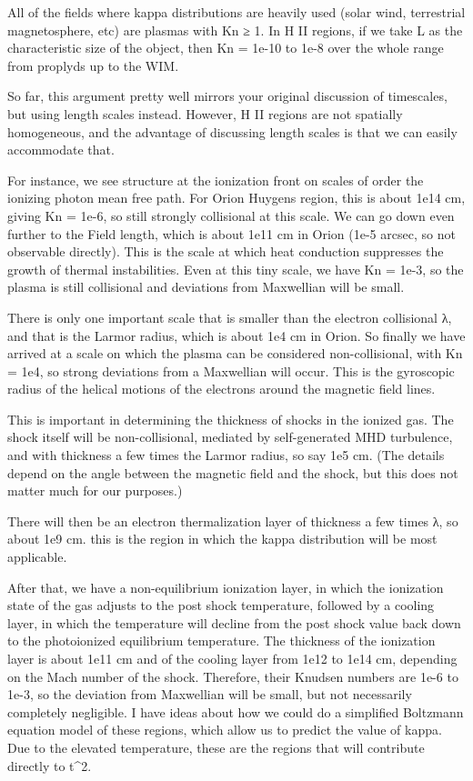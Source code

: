 \documentclass[11pt]{article}
\begin{document}
All of the fields where kappa distributions are heavily used (solar wind, terrestrial magnetosphere, etc) are plasmas with Kn ≥ 1.  In H II regions, if we take L as the characteristic size of the object, then Kn = 1e-10 to 1e-8 over the whole range from proplyds up to the WIM.

So far, this argument pretty well mirrors your original discussion of timescales, but using length scales instead.  However, H II regions are not spatially homogeneous, and the advantage of discussing length scales is that we can easily accommodate that.

For instance, we see structure at the ionization front on scales of order the ionizing photon mean free path.  For Orion Huygens region, this is about 1e14 cm, giving Kn = 1e-6, so still strongly collisional at this scale.  We can go down even further to the Field length, which is about 1e11 cm in Orion (1e-5 arcsec, so not observable directly).  This is the scale at which heat conduction suppresses the growth of thermal instabilities. Even at this tiny scale, we have Kn = 1e-3, so the plasma is still collisional and deviations from Maxwellian will be small.

There is only one important scale that is smaller than the electron collisional λ, and that is the Larmor radius, which is about 1e4 cm in Orion.  So finally we have arrived at a scale on which the plasma can be considered non-collisional, with Kn = 1e4, so strong deviations from a Maxwellian will occur.  This is the gyroscopic radius of the helical motions of the electrons around the magnetic field lines.

This is important in determining the thickness of shocks in the ionized gas.  The shock itself will be non-collisional, mediated by self-generated MHD turbulence, and with thickness a few times the Larmor radius, so say 1e5 cm.  (The details depend on the angle between the magnetic field and the shock, but this does not matter much for our purposes.)

There will then be an electron thermalization layer of thickness a few times λ, so about 1e9 cm.  this is the region in which the kappa distribution will be most applicable.

After that, we have a non-equilibrium ionization layer, in which the ionization state of the gas adjusts to the  post shock temperature, followed by a cooling layer, in which the temperature will  decline from the post shock value back down to the photoionized equilibrium temperature.    The thickness of the ionization layer is about 1e11 cm and of the cooling layer from 1e12 to 1e14 cm, depending on the Mach number of the shock.  Therefore, their Knudsen numbers are 1e-6 to 1e-3, so the deviation from Maxwellian will be small, but not necessarily completely negligible.  I have ideas about how we could do a simplified Boltzmann equation model of these  regions, which allow us to predict the value of kappa.  Due to the elevated temperature, these are the regions that will contribute directly to t\^{}2.
\end{document}
